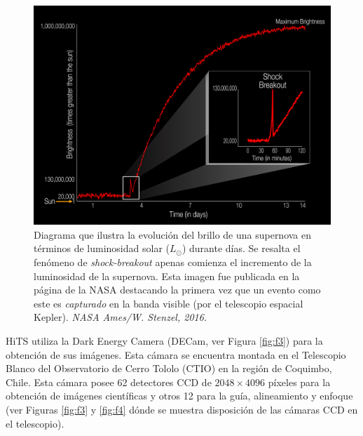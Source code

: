 

\begin{figure}[h!]
\centering
\includegraphics[scale=.25]{images/breakout}
\caption{Diagrama que ilustra la evoluci\'on del brillo de una supernova en t\'erminos de luminosidad solar ($L_{\odot}$) durante d\'ias. Se resalta el fen\'omeno de \textit{shock-breakout} apenas comienza el incremento de la luminosidad de la supernova. Esta imagen fue publicada en la p\'agina de la NASA destacando la primera vez que un evento como este es \textit{capturado} en la banda visible (por el telescopio espacial Kepler). \textit{NASA Ames/W. Stenzel, 2016.}}
\label{fig:f2}
\end{figure}

HiTS utiliza la Dark Energy Camera (DECam, ver Figura \ref{fig:f3}) para la obtenci\'on de sus im\'agenes. Esta c\'amara se encuentra montada en el Telescopio Blanco del Observatorio de Cerro Tololo (CTIO) en la regi\'on de Coquimbo, Chile. Esta c\'amara posee 62 detectores CCD de $2048 \times 4096$ p\'ixeles para la obtenci\'on de im\'agenes cient\'ificas y otros 12 para la gu\'ia, alineamiento y enfoque (ver Figuras \ref{fig:f3} y \ref{fig:f4} d\'onde se muestra disposici\'on de las c\'amaras CCD en el telescopio). 
\bigskip

